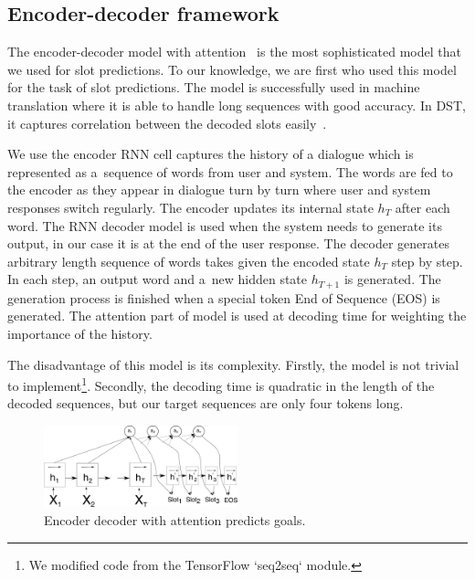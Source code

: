 \documentclass{itatnew}
\def\PB#1{\textcolor{red}{PB: \textit{#1}}}
\begin{document}
\subsection{Encoder-decoder framework}
\label{sec:encdec}
The encoder-decoder model with attention~\cite{bahdanau2014neural} is the most sophisticated model that we used for slot predictions.
To our knowledge, we are first who used this model for the task of slot predictions.
The model is successfully used in machine translation where it is able to handle long sequences with good accuracy.
In DST, it captures correlation between the decoded slots easily~\cite{bahdanau2014neural}. 

We use the encoder RNN cell captures the history of a dialogue which is represented as a~sequence of words from user and system.
The words are fed to the encoder as they appear in dialogue turn by turn where user and system responses switch regularly.
The encoder updates its internal state $h_T$ after each word.
The RNN decoder model is used when the system needs to generate its output, in our case it is at the end of the user response.
The decoder generates arbitrary length sequence of words takes given the encoded state $h_T$ step by step.
In each step, an output word and a~new hidden state $h_{T+1}$ is generated.
The generation process is finished when a special token End of Sequence (EOS) is generated.
The attention part of model is used at decoding time for weighting the importance of the history. 

The disadvantage of this model is its complexity.
Firstly, the model is not trivial to implement\footnote{We modified code from the TensorFlow `seq2seq` module.}. 
Secondly, the decoding time is quadratic in the length of the decoded sequences, but our target sequences are only four tokens long.
\begin{figure}
\includegraphics[width=0.5\textwidth]{encdec}
\caption{Encoder decoder with attention predicts goals.}
\label{fig:encdec}
\end{figure}
\end{document}

